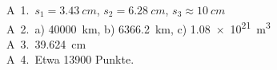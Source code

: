 A\ 1.~$s_1=\SI {3.43}{cm}$, $s_2=\SI {6.28}{cm}$, $s_3\approx \SI {10}{cm}$\\
A\ 2.~a) \SI {40000}{km}, b) \SI {6366.2}{km}, c) \SI {1.08e+21}{m^3}\\
A\ 3.~\SI {39.624}{cm}\\
A\ 4.~Etwa \num {13900} Punkte.\\
